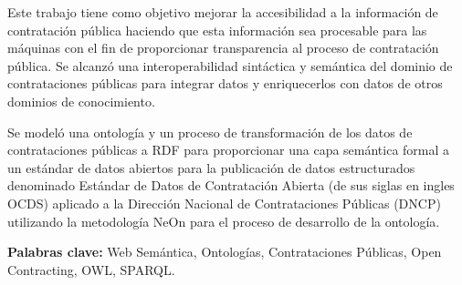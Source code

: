 \begin{resumen}

Este trabajo tiene como objetivo mejorar la accesibilidad a la información de contratación pública haciendo que esta información sea procesable para las máquinas con el fin de proporcionar transparencia al proceso de contratación pública. Se alcanzó una interoperabilidad sintáctica y semántica del dominio de contrataciones públicas para integrar datos y enriquecerlos con datos de otros dominios de conocimiento.

Se modeló una ontología y un proceso de transformación de los datos de contrataciones públicas a RDF para proporcionar una capa semántica formal a un estándar de datos abiertos para la publicación de datos estructurados denominado Estándar de Datos de Contratación Abierta (de sus siglas en ingles OCDS) aplicado a la Dirección Nacional de Contrataciones Públicas (DNCP) utilizando la metodología NeOn para el proceso de desarrollo de la ontología.
    
\textbf{Palabras clave:} Web Semántica,  Ontologías, Contrataciones Públicas, Open Contracting, OWL, SPARQL.
\end{resumen}


